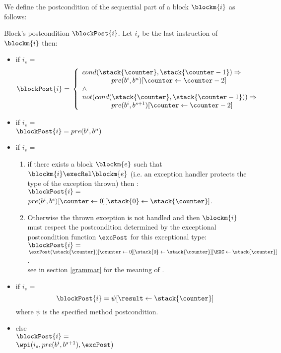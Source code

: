 We define the postcondition of the sequential part of a block $\blockm{i}$ as follows:
\begin{definition}
{Block's postcondition $\blockPost{i}$.}\label{post}
Let $i_s$ be the last instruction of $\blockm{i}$ then:
\begin{itemize} 
\item if  $i_s$ =   
$$
\blockPost{i} =  \\
\left\{
\begin{array}{l}
cond( \stack{\counter}, \stack{\counter - 1} )   \Rightarrow \\
\phantom{ \counter }   pre(b^{i}, b^{n})[ \counter \leftarrow \counter -2 ]  \\
\wedge \\
 not ( cond( \stack{\counter}, \stack{\counter - 1} )  )   \Rightarrow \\
\phantom{ \counter}    pre(b^{i}, b^{s+1})[ \counter \leftarrow \counter -2 ]      \\                             
\end{array}
\right.
$$
\item if  $i_s$ =   \\ 
$\blockPost{i} =  pre(b^{i}, b^{n})$ 
\item  if  $i_s$ =  
\begin{enumerate}
\item if there exists a block $\blockm{e}$ such that 
$\blockm{i} \execRel \blockm{e}$ (i.e. an exception handler protects the type of the exception thrown)
then :\\
$\blockPost{i }=$\\
$ pre(b^{i}, b^{e})[\counter \leftarrow 0][\stack{0} \leftarrow \stack{\counter}] $.
\item Otherwise the thrown exception is not handled and then $\blockm{i}$ must respect the postcondition determined by
the exceptional postcondition function $\excPost$ for this exceptional type:\\ %
 $\blockPost{i }=$\\ $\excPost(\stack{\counter}) [\counter \leftarrow 0][\stack{0} \leftarrow \stack{\counter} ] [\EXC \leftarrow \stack{\counter}] $. \\
see in section \ref{grammar} for the meaning of \EXC.
    \end{enumerate}
\item  if  $i_s$ = 
$$
   \blockPost{i } = \psi[\result \leftarrow \stack{\counter} ]    
$$
where $\psi $ is the specified method postcondition.
\item  else  \\[3 mm]
 $ \blockPost{i} =$  \\ $\wpi(  i_s , pre(b^{i}, b^{s+1}) , \excPost)  $
 \end{itemize}

\end{definition}
